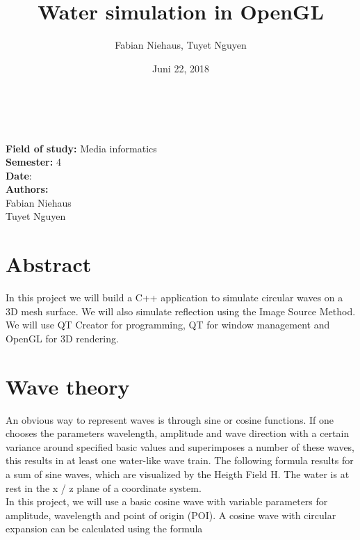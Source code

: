 \documentclass[12pt,a4paper]{scrartcl}
\title{Water simulation in OpenGL}
\author{Fabian Niehaus, Tuyet Nguyen}
\date{Juni 22, 2018}
\begin{document}
\begin{titlepage}
	\centering
	\ \\[2cm]
	{\huge\textbf{\@title}} 
	\\[3cm]
	\large
	\textbf{Field of study:} Media informatics \\
	\textbf{Semester:} 4
	\\[2cm]
	\textbf{Date}: \@date
	\\[2cm]
	\textbf {Authors:}
	\\Fabian Niehaus
	\\Tuyet Nguyen
\end{titlepage}

\newpage
\setcounter{page}{0}
\tableofcontents
\newpage
\listoffigures

\newpage
\ofoot[]{\pagemark}
\normalsize

\section{Abstract}
In this project we will build a C++ application to simulate circular waves on a 3D mesh surface. We will also simulate reflection using the Image Source Method. We will use QT Creator for programming, QT for window management and OpenGL for 3D rendering.

\section{Wave theory}
An obvious way to represent waves is through sine or cosine functions. If one chooses the parameters wavelength, amplitude and wave direction with a certain variance around specified basic values and superimposes a number of these waves, this results in at least one water-like wave train. The following formula results for a sum of sine waves, which are visualized by the Heigth Field H. The water is at rest in the x / z plane of a coordinate system.\\

In this project, we will use a basic cosine wave with variable parameters for amplitude, wavelength and point of origin (POI). A cosine wave with circular expansion can be calculated using the formula
\end{document}
